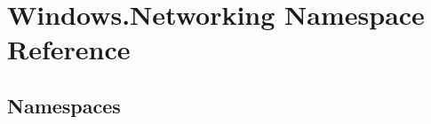 \hypertarget{namespace_windows_1_1_networking}{}\section{Windows.\+Networking Namespace Reference}
\label{namespace_windows_1_1_networking}
\subsection*{Namespaces}
\begin{DoxyCompactItemize}
\end{DoxyCompactItemize}
